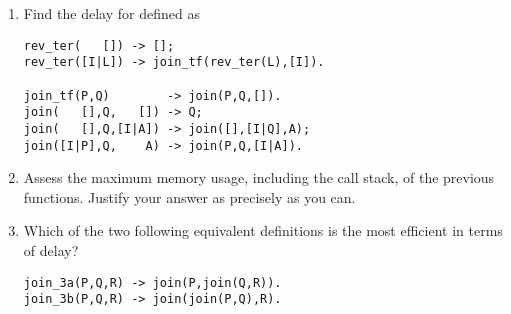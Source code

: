 \begin{enumerate}

  \item Find the delay for  defined as
\begin{verbatim}
rev_ter(   []) -> [];
rev_ter([I|L]) -> join_tf(rev_ter(L),[I]).

join_tf(P,Q)        -> join(P,Q,[]).
join(   [],Q,   []) -> Q;
join(   [],Q,[I|A]) -> join([],[I|Q],A);
join([I|P],Q,    A) -> join(P,Q,[I|A]).
\end{verbatim}

  \item Assess the maximum memory usage, including the call stack, of
    the previous functions. Justify your answer as precisely as you
    can.

  \item Which of the two following equivalent definitions is the most
    efficient in terms of delay?
\begin{verbatim}
join_3a(P,Q,R) -> join(P,join(Q,R)).
join_3b(P,Q,R) -> join(join(P,Q),R).
\end{verbatim}

\end{enumerate}
